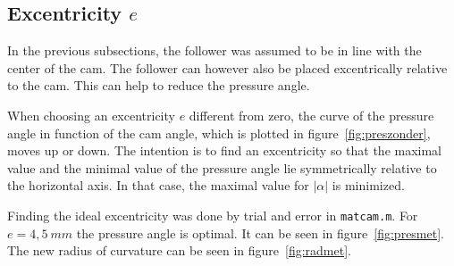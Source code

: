 \documentclass[a4paper]{article}
\begin{document}
\subsection{Excentricity \(e\)}

In the previous subsections, the follower was assumed to be in line with the center of the cam. The follower can however also be placed excentrically relative to the cam. This can help to reduce the pressure angle.

When choosing an excentricity \(e\) different from zero, the curve of the pressure angle in function of the cam angle, which is plotted in figure~\ref{fig:preszonder}, moves up or down. The intention is to find an excentricity so that the maximal value and the minimal value of the pressure angle lie symmetrically relative to the horizontal axis. In that case, the maximal value for \(|\alpha|\) is minimized.

Finding the ideal excentricity was done by trial and error in \texttt{matcam.m}. For \textbf{\(e=4,5~mm\)} the pressure angle is optimal. It can be seen in figure~\ref{fig:presmet}. The new radius of curvature can be seen in figure~\ref{fig:radmet}.
\end{document}
